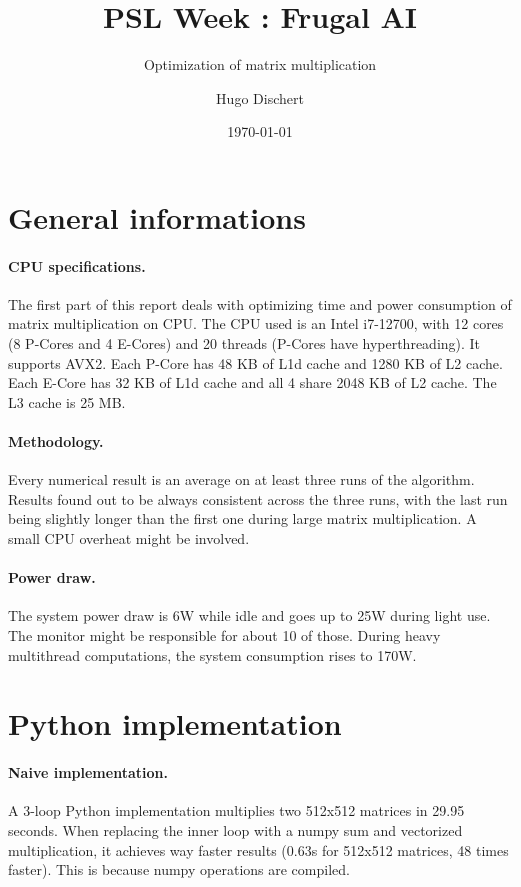 \documentclass[a4paper,DIV=16]{scrartcl}
\author{Hugo Dischert}
\date{\today}
\title{PSL Week : Frugal AI}
\subtitle{Optimization of matrix multiplication}
\begin{document}
\maketitle
\tableofcontents
\FloatBarrier
\newpage
\section{General informations}
\paragraph{CPU specifications.}
The first part of this report deals with optimizing time and power consumption of matrix multiplication on CPU.
The CPU used is an Intel i7-12700, with 12 cores (8 P-Cores and 4 E-Cores) and 20 threads (P-Cores have hyperthreading).
It supports AVX2. 
Each P-Core has 48 KB of L1d cache and 1280 KB of L2 cache.
Each E-Core has 32 KB of L1d cache and all 4 share 2048 KB of L2 cache.
The L3 cache is 25 MB.

\paragraph{Methodology.}
Every numerical result is an average on at least three runs of the algorithm. 
Results found out to be always consistent across the three runs, with the last run being slightly longer than the first one during large matrix multiplication.
A small CPU overheat might be involved.

\paragraph{Power draw.}
The system power draw is 6W while idle and goes up to 25W during light use.
The monitor might be responsible for about 10 of those.
During heavy multithread computations, the system consumption rises to 170W.

\FloatBarrier
\section{Python implementation}
\paragraph{Naive implementation.}
A 3-loop Python implementation multiplies two 512x512 matrices in 29.95 seconds.
When replacing the inner loop with a numpy sum and vectorized multiplication, it achieves way faster results (0.63s for 512x512 matrices, 48 times faster).
This is because numpy operations are compiled.
\end{document}
